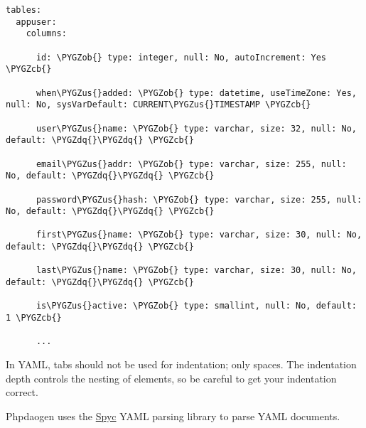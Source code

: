 \documentclass[letterpaper,10pt,english]{sphinxmanual}
\def\PYGZus{\char`\_}
\def\PYGZob{\char`\{}
\def\PYGZcb{\char`\}}
\def\PYGZdq{\char`\"}
\begin{document}
\begin{Verbatim}[commandchars=\\\{\}]
tables:
  appuser:
    columns:

      id: \PYGZob{} type: integer, null: No, autoIncrement: Yes \PYGZcb{}

      when\PYGZus{}added: \PYGZob{} type: datetime, useTimeZone: Yes, null: No, sysVarDefault: CURRENT\PYGZus{}TIMESTAMP \PYGZcb{}

      user\PYGZus{}name: \PYGZob{} type: varchar, size: 32, null: No, default: \PYGZdq{}\PYGZdq{} \PYGZcb{}

      email\PYGZus{}addr: \PYGZob{} type: varchar, size: 255, null: No, default: \PYGZdq{}\PYGZdq{} \PYGZcb{}

      password\PYGZus{}hash: \PYGZob{} type: varchar, size: 255, null: No, default: \PYGZdq{}\PYGZdq{} \PYGZcb{}

      first\PYGZus{}name: \PYGZob{} type: varchar, size: 30, null: No, default: \PYGZdq{}\PYGZdq{} \PYGZcb{}

      last\PYGZus{}name: \PYGZob{} type: varchar, size: 30, null: No, default: \PYGZdq{}\PYGZdq{} \PYGZcb{}

      is\PYGZus{}active: \PYGZob{} type: smallint, null: No, default: 1 \PYGZcb{}

      ...
\end{Verbatim}

In YAML, tabs should not be used for indentation; only spaces.  The indentation depth controls the
nesting of elements, so be careful to get your indentation correct.

Phpdaogen uses the \href{http://code.google.com/p/spyc/}{Spyc} YAML parsing library to parse YAML
documents.
\end{document}

